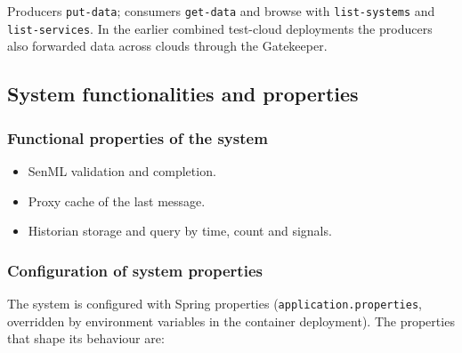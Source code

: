 \documentclass[a4paper]{arrowhead}
\begin{document}
Producers \texttt{put-\allowbreak{}data}; consumers \texttt{get-\allowbreak{}data} and browse with \texttt{list-\allowbreak{}systems} and \texttt{list-\allowbreak{}services}. In the earlier combined test-cloud deployments the producers also forwarded data across clouds through the Gatekeeper.

\subsection{System functionalities and properties}
\label{sec:properties}

\subsubsection{Functional properties of the system}

\begin{itemize}
  \item SenML validation and completion.
  \item Proxy cache of the last message.
  \item Historian storage and query by time, count and signals.
\end{itemize}

\subsubsection{Configuration of system properties}

The system is configured with Spring properties (\texttt{application.properties}, overridden by environment variables in the container deployment). The properties that shape its behaviour are:
\end{document}
